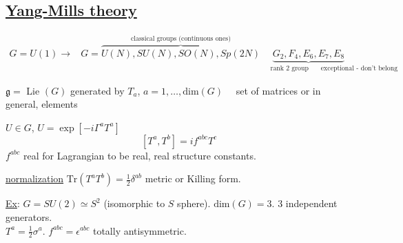 \documentclass[twoside]{amsart}
\begin{document}
\subsection*{ \underline{ Yang-Mills theory} }

\[
\begin{aligned}
G = U(1) \to & G = \overbrace{ U(N), SU(N), SO(N), Sp(2N) }^{ \text{ classical groups (continuous ones) } }
& \underbrace{ G_2, F_4, E_6, E_7, E_8 }_{ \text{ rank 2 group } \quad \, \text{ exceptional - don't belong to infinite families } }
\end{aligned}
\]


$\mathfrak{g} = $ Lie $(G)$ generated by $T_a$, $a=1, \dots, \text{dim}{(G)}$ \, \, set of matrices or in general, elements

$U \in G$, $U = \exp{ [ -i \Gamma^a T^a ] }$
\[
[T^a, T^b] = i f^{abc} T^c
\]
$f^{abc}$ real for Lagrangian to be real, real structure constants.  

\underline{normalization} $\text{Tr}{ (T^a T^b) } = \frac{1}{2} \delta^{ab}$ metric or Killing form.  

\underline{Ex}: $G = SU(2) \simeq S^2$  (isomorphic to $S$ sphere).  $\text{dim}{ (G) } = 3$.  3 independent generators.  \\
$T^a = \frac{1}{2} \sigma^a$.  $f^{abc} = \epsilon^{abc}$ totally antisymmetric.  
\end{document}

